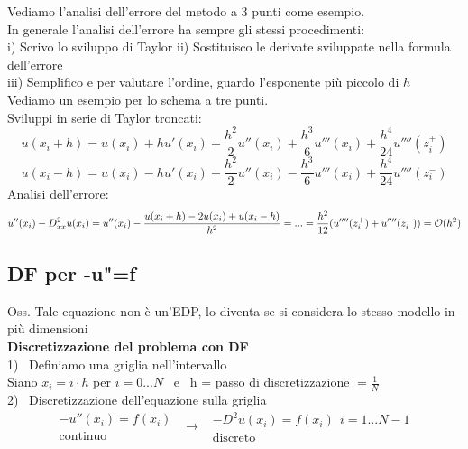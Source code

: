 \documentclass{article}
\begin{document}
\phantom{}

Vediamo l'analisi dell'errore del metodo a 3 punti come esempio.\\
In generale l'analisi dell'errore ha sempre gli stessi procedimenti:\\
i) Scrivo lo sviluppo di Taylor
ii) Sostituisco le derivate sviluppate nella formula dell'errore\\
iii) Semplifico e per valutare l'ordine, guardo l'esponente più piccolo di $h$\\

Vediamo un esempio per lo schema a tre punti.\\
Sviluppi in serie di Taylor troncati:
\[
u(x_i+h) = u(x_i)+hu'(x_i)+\frac{h^2}{2} u''(x_i) + \frac{h^3}{6}u'''(x_i) + \frac{h^4}{24}u''''(z_i^+)
\]
\[
u(x_i-h) = u(x_i)-hu'(x_i)+\frac{h^2}{2} u''(x_i) - \frac{h^3}{6}u'''(x_i) + \frac{h^4}{24}u''''(z_i^-)
\]
Analisi dell'errore:
\[
u''(x_i)-D^2_{xx}u(x_i) = u''(x_i) - \dfrac{u(x_i+h)-2u(x_i)+u(x_i-h)}{h^2} = ... = \dfrac{h^2}{12}(u''''(z_i^+)+u''''(z_i^-)) = \mathcal O(h^2)
\]

\phantom{}

\subsection{DF per -u"=f}


Oss. Tale equazione non è un'EDP, lo diventa se si considera lo stesso modello in più dimensioni\\


\textbf{Discretizzazione del problema con DF}\\

1) \ Definiamo una griglia nell'intervallo\\
Siano $x_i=i\cdot h$ per $i=0...N$ \ e \ h = passo di discretizzazione $= \frac{1}{N}$\\

2) \ Discretizzazione dell'equazione sulla griglia\\
\[
\begin{array}{c}
     -u''(x_i)=f(x_i) \\
     \text{continuo}
\end{array} \ \ \longrightarrow \ \ \begin{array}{c}
     -D^2 u(x_i)=f(x_i) \ \ i=1...N-1\\
     \text{discreto}
\end{array}
\]
\phantom{}
\end{document}
